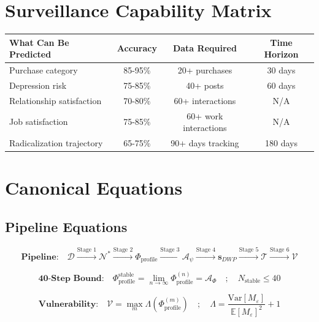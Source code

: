 \documentclass[11pt,twoside]{book}
\renewcommand{\arraystretch}{1.2}
\theoremstyle{definition}
\theoremstyle{plain}
\theoremstyle{remark}
\newcommand{\Noetics}{\mathcal{N}}
\newcommand{\FractalAttractor}{\mathcal{A}_\Phi}
\newcommand{\PsychAttractor}{\mathcal{A}_\psi}
\newcommand{\Lacunarity}{\Lambda}
\newcommand{\DigitalTrace}{\mathcal{D}}
\newcommand{\ProfileFrac}{\Phi_{\mathrm{profile}}}
\newcommand{\VulnScore}{\mathcal{V}}
\newcommand{\Timeline}{\mathcal{T}}
\begin{document}
\chapter{Surveillance Capability Matrix}
\label{ch:pred-capability}

\begin{center}
\small
\renewcommand{\arraystretch}{1.3}
\begin{tabularx}{\textwidth}{l|c|c|c}
\toprule
\textbf{What Can Be Predicted} & \textbf{Accuracy} & \textbf{Data Required} & \textbf{Time Horizon} \\
\midrule
Purchase category & 85-95\% & 20+ purchases & 30 days \\
Depression risk & 75-85\% & 40+ posts & 60 days \\
Relationship satisfaction & 70-80\% & 60+ interactions & N/A \\
Job satisfaction & 75-85\% & 60+ work interactions & N/A \\
Radicalization trajectory & 65-75\% & 90+ days tracking & 180 days \\
\bottomrule
\end{tabularx}
\end{center}

\chapter{Canonical Equations}
\label{ch:pred-equations}

\section{Pipeline Equations}

\begin{equation}
\boxed{
    \textbf{Pipeline:} \quad
    \DigitalTrace \xrightarrow{\text{Stage 1}} \Noetics^*
    \xrightarrow{\text{Stage 2}} \ProfileFrac
    \xrightarrow{\text{Stage 3}} \PsychAttractor
    \xrightarrow{\text{Stage 4}} \mathbf{s}_{DWP}
    \xrightarrow{\text{Stage 5}} \Timeline
    \xrightarrow{\text{Stage 6}} \VulnScore
}
\end{equation}

\begin{equation}
\boxed{
    \textbf{40-Step Bound:} \quad
    \ProfileFrac^{\text{stable}} = \lim_{n \to \infty} \ProfileFrac^{(n)} = \FractalAttractor
    \quad ; \quad N_{\mathrm{stable}} \leq 40
}
\end{equation}

\begin{equation}
\boxed{
    \textbf{Vulnerability:} \quad
    \VulnScore = \max_m \Lacunarity(\ProfileFrac^{(m)})
    \quad ; \quad \Lacunarity = \frac{\mathrm{Var}[M_\varepsilon]}{\mathbb{E}[M_\varepsilon]^2} + 1
}
\end{equation}
\end{document}
